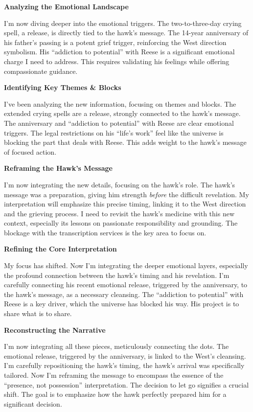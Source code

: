 \documentclass{article}
\begin{document}
\textbf{Analyzing the Emotional Landscape}

I'm now diving deeper into the emotional triggers. The two-to-three-day
crying spell, a release, is directly tied to the hawk's message. The
14-year anniversary of his father's passing is a potent grief trigger,
reinforcing the West direction symbolism. His ``addiction to potential''
with Reese is a significant emotional charge I need to address. This
requires validating his feelings while offering compassionate guidance.

\textbf{Identifying Key Themes \& Blocks}

I've been analyzing the new information, focusing on themes and blocks.
The extended crying spells are a release, strongly connected to the
hawk's message. The anniversary and ``addiction to potential'' with
Reese are clear emotional triggers. The legal restrictions on his
``life's work'' feel like the universe is blocking the part that deals
with Reese. This adds weight to the hawk's message of focused action.

\textbf{Reframing the Hawk's Message}

I'm now integrating the new details, focusing on the hawk's role. The
hawk's message was a preparation, giving him strength \emph{before} the
difficult revelation. My interpretation will emphasize this precise
timing, linking it to the West direction and the grieving process. I
need to revisit the hawk's medicine with this new context, especially
its lessons on passionate responsibility and grounding. The blockage
with the transcription services is the key area to focus on.

\textbf{Refining the Core Interpretation}

My focus has shifted. Now I'm integrating the deeper emotional layers,
especially the profound connection between the hawk's timing and his
revelation. I'm carefully connecting his recent emotional release,
triggered by the anniversary, to the hawk's message, as a necessary
cleansing. The ``addiction to potential'' with Reese is a key driver,
which the universe has blocked his way. His project is to share what is
to share.

\textbf{Reconstructing the Narrative}

I'm now integrating all these pieces, meticulously connecting the dots.
The emotional release, triggered by the anniversary, is linked to the
West's cleansing. I'm carefully repositioning the hawk's timing, the
hawk's arrival was specifically tailored. Now I'm reframing the message
to encompass the essence of the ``presence, not possession''
interpretation. The decision to let go signifies a crucial shift. The
goal is to emphasize how the hawk perfectly prepared him for a
significant decision.
\end{document}
